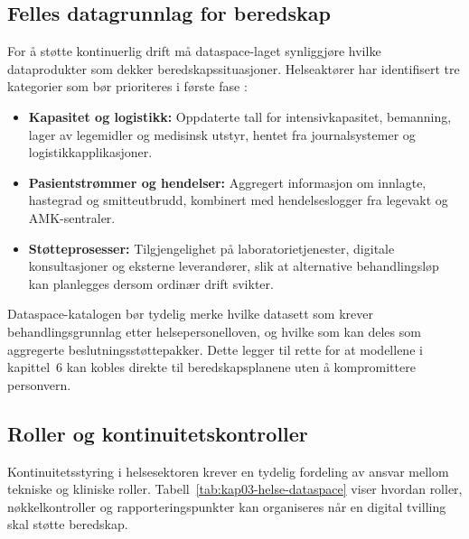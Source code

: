 \subsection{Felles datagrunnlag for beredskap}
For å støtte kontinuerlig drift må dataspace-laget synliggjøre hvilke dataprodukter som dekker beredskapssituasjoner. Helseaktører
har identifisert tre kategorier som bør prioriteres i første fase \citep{helsedir2023beredskap,helseplattformen2023kontinuitet}:
\begin{itemize}
    \item \textbf{Kapasitet og logistikk:} Oppdaterte tall for intensivkapasitet, bemanning, lager av legemidler og medisinsk utstyr,
    hentet fra journalsystemer og logistikkapplikasjoner.
    \item \textbf{Pasientstrømmer og hendelser:} Aggregert informasjon om innlagte, hastegrad og smitteutbrudd, kombinert med
    hendelseslogger fra legevakt og AMK-sentraler.
    \item \textbf{Støtteprosesser:} Tilgjengelighet på laboratorietjenester, digitale konsultasjoner og eksterne leverandører,
    slik at alternative behandlingsløp kan planlegges dersom ordinær drift svikter.
\end{itemize}
Dataspace-katalogen bør tydelig merke hvilke datasett som krever behandlingsgrunnlag etter helsepersonelloven, og hvilke som
kan deles som aggregerte beslutningsstøttepakker. Dette legger til rette for at modellene i kapittel~6 kan kobles direkte til
beredskapsplanene uten å kompromittere personvern.

\subsection{Roller og kontinuitetskontroller}
Kontinuitetsstyring i helsesektoren krever en tydelig fordeling av ansvar mellom tekniske og kliniske roller. Tabell~\ref{tab:kap03-helse-dataspace}
viser hvordan roller, nøkkelkontroller og rapporteringspunkter kan organiseres når en digital tvilling skal støtte beredskap.

